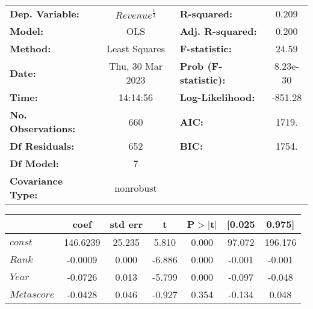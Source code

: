     \begin{table}[H]
        \begin{center}
            \begin{tabular}{lclc}
            \toprule
            \textbf{Dep. Variable:}           &  $Revenue^{\frac{1}{3}}$   & \textbf{  R-squared:         } &     0.209   \\
            \textbf{Model:}                   &       OLS        & \textbf{  Adj. R-squared:    } &     0.200   \\
            \textbf{Method:}                  &  Least Squares   & \textbf{  F-statistic:       } &     24.59   \\
            \textbf{Date:}                    & Thu, 30 Mar 2023 & \textbf{  Prob (F-statistic):} &  8.23e-30   \\
            \textbf{Time:}                    &     14:14:56     & \textbf{  Log-Likelihood:    } &   -851.28   \\
            \textbf{No. Observations:}        &         660      & \textbf{  AIC:               } &     1719.   \\
            \textbf{Df Residuals:}            &         652      & \textbf{  BIC:               } &     1754.   \\
            \textbf{Df Model:}                &           7      & \textbf{                     } &             \\
            \textbf{Covariance Type:}         &    nonrobust     & \textbf{                     } &             \\
            \bottomrule
            \end{tabular}
            \begin{tabular}{lcccccc}
                                              & \textbf{coef} & \textbf{std err} & \textbf{t} & \textbf{P$> |$t$|$} & \textbf{[0.025} & \textbf{0.975]}  \\
            \midrule
            \textbf{$const$}                &     146.6239  &       25.235     &     5.810  &         0.000        &       97.072    &      196.176     \\
            \textbf{$Rank$}                 &      -0.0009  &        0.000     &    -6.886  &         0.000        &       -0.001    &       -0.001     \\
            \textbf{$Year$}                 &      -0.0726  &        0.013     &    -5.799  &         0.000        &       -0.097    &       -0.048     \\
            \textbf{$Metascore$}            &      -0.0428  &        0.046     &    -0.927  &         0.354        &       -0.134    &        0.048     \\

\end{tabular}
\end{center}
\end{table}
